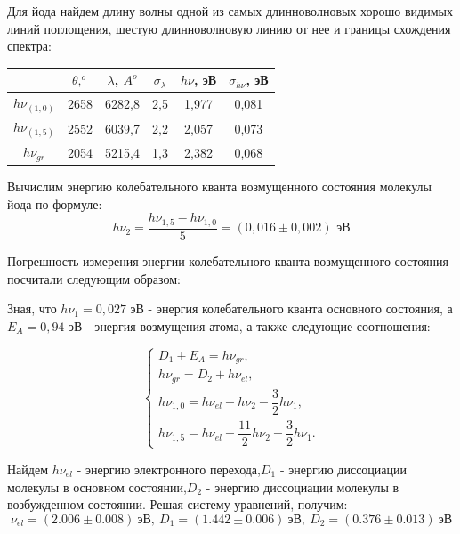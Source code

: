 \documentclass[a4paper,12pt]{report}
\begin{document}
Для йода найдем длину волны одной из самых длинноволновых хорошо видимых линий поглощения, шестую длинноволновую линию от нее и границы схождения спектра:

\begin{table}[H]
\begin{tabular}{|c|c|c|c|c|c|}
\hline
               & $\theta, ^{o}$ & $\lambda$, $A^{o}$ & $\sigma_{\lambda}$ & $h\nu$, эВ  & $\sigma_{h\nu}$, эВ \\ \hline
$h\nu_{(1,0)}$ & 2658  & 6282,8 & 2,5               & 1,977 & 0,081     \\ \hline
$h\nu_{(1,5)}$ & 2552  & 6039,7 & 2,2               & 2,057 & 0,073     \\ \hline
$h\nu_{gr}$    & 2054  & 5215,4 & 1,3               & 2,382 & 0,068     \\ \hline
\end{tabular}
\end{table}


Вычислим энергию колебательного кванта возмущенного состояния молекулы йода по формуле:
\begin{equation*}
  h\nu_{2} = \frac{h\nu_{1,5}-h\nu_{1,0}}{5} = (0,016 \pm 0,002)\text{ эВ}
\end{equation*}

Погрешность измерения энергии колебательного кванта возмущенного состояния посчитали следующим образом:

Зная, что $h\nu_{1} = 0,027$ эВ - энергия колебательного кванта основного состояния, а $E_{A} = 0,94$ эВ - энергия возмущения атома, а также следующие соотношения:

\begin{equation*}
			\begin{cases}
				D_1+E_A=h \nu_{gr},\\
				h\nu_{gr}=D_2+h \nu_{el},\\
				h\nu_{1,0}=h \nu_{el}+h\nu_2-\dfrac{3}{2}h\nu_1,\\
					h\nu_{1,5}=h \nu_{el}+\dfrac{11}{2}h\nu_2-\dfrac{3}{2}h\nu_1.
			\end{cases}
		\end{equation*}

Найдем $h \nu_{el}$ - энергию электронного перехода,$D_{1}$ - энергию диссоциации молекулы в основном состоянии,$D_{2}$ - энергию диссоциации молекулы в возбужденном состоянии. Решая систему уравнений, получим:
\[\boxed{\nu_{el}=(2.006\pm 0.008) \ \text{эВ}, \ D_1=(1.442\pm 0.006)\  \text{эВ}, \  D_2=(0.376 \pm 0.013) \ \text{эВ}}\]
\end{document}
